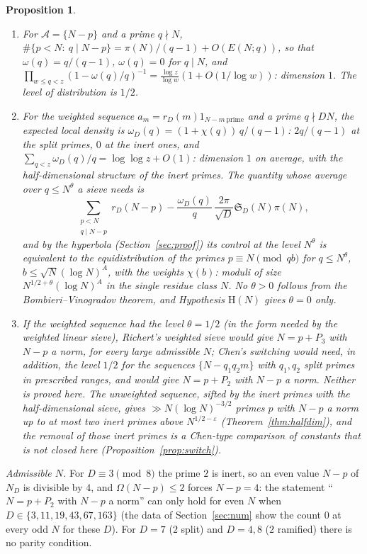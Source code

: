 \documentclass[11pt]{amsart}
\newtheorem{proposition}[theorem]{Proposition}
\theoremstyle{definition}
\theoremstyle{remark}
\newcommand{\e}{\varepsilon}
\newcommand{\sS}{\mathfrak S}
\begin{document}
\begin{proposition}\label{prop:sieve}
\begin{enumerate}[label=\textup{(\roman*)},leftmargin=2.2em]
\item For $\mathcal A=\{N-p\}$ and a prime $q\nmid N$, $\#\{p<N:\ q\mid N-p\}=\pi(N)/(q-1)+O(E(N;q))$, so that $\omega(q)=q/(q-1)$, $\omega(q)=0$ for $q\mid N$, and $\prod_{w\le q<z}(1-\omega(q)/q)^{-1}=\frac{\log z}{\log w}(1+O(1/\log w))$: dimension $1$. The level of distribution is $1/2$.
\item For the weighted sequence $a_m=r_D(m)1_{N-m\ \mathrm{prime}}$ and a prime $q\nmid DN$, the expected local density is $\omega_D(q)=(1+\chi(q))\,q/(q-1)$: $2q/(q-1)$ at the split primes, $0$ at the inert ones, and $\sum_{q<z}\omega_D(q)/q=\log\log z+O(1)$: dimension $1$ on average, with the half-dimensional structure of the inert primes. The quantity whose average over $q\le N^\theta$ a sieve needs is
\[
\sum_{\substack{p<N\\ q\mid N-p}}r_D(N-p)-\frac{\omega_D(q)}q\,\frac{2\pi}{\sqrt D}\sS_D(N)\pi(N),
\]
and by the hyperbola (Section~\ref{sec:proof}) its control at the level $N^\theta$ is equivalent to the equidistribution of the primes $p\equiv N\pmod{qb}$ for $q\le N^\theta$, $b\le\sqrt N(\log N)^A$, with the weights $\chi(b)$: moduli of size $N^{1/2+\theta}(\log N)^A$ in the single residue class $N$. No $\theta>0$ follows from the Bombieri--Vinogradov theorem, and Hypothesis $\mathrm H(N)$ gives $\theta=0$ only.
\item If the weighted sequence had the level $\theta=1/2$ (in the form needed by the weighted linear sieve), Richert's weighted sieve would give $N=p+P_3$ with $N-p$ a norm, for every large admissible $N$; Chen's switching would need, in addition, the level $1/2$ for the sequences $\{N-q_1q_2m\}$ with $q_1,q_2$ split primes in prescribed ranges, and would give $N=p+P_2$ with $N-p$ a norm. Neither is proved here. The unweighted sequence, sifted by the inert primes with the half-dimensional sieve, gives $\gg N(\log N)^{-3/2}$ primes $p$ with $N-p$ a norm up to at most two inert primes above $N^{1/2-\e}$ (Theorem~\ref{thm:halfdim}), and the removal of those inert primes is a Chen-type comparison of constants that is not closed here (Proposition~\ref{prop:switch}).
\end{enumerate}
\end{proposition}

\emph{Admissible $N$.} For $D\equiv3\pmod8$ the prime $2$ is inert, so an even value $N-p$ of $N_D$ is divisible by $4$, and $\Omega(N-p)\le2$ forces $N-p=4$: the statement ``$N=p+P_2$ with $N-p$ a norm'' can only hold for even $N$ when $D\in\{3,11,19,43,67,163\}$ (the data of Section~\ref{sec:num} show the count $0$ at every odd $N$ for these $D$). For $D=7$ ($2$ split) and $D=4,8$ ($2$ ramified) there is no parity condition.
\end{document}
